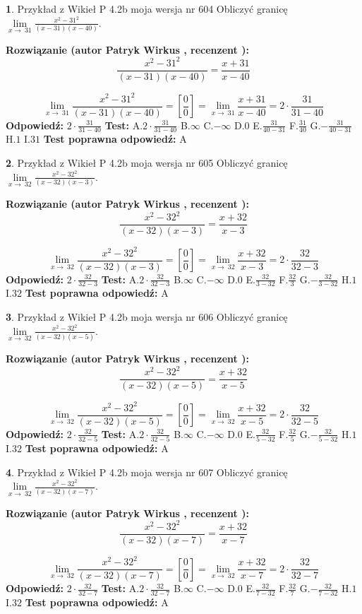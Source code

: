 \documentclass[12pt, a4paper]{article}
\theoremstyle{definition} %
\newtheorem{zad}{}
\newcommand{\zadStart}[1]{\begin{zad}#1\newline}
\newcommand{\zadStop}{\end{zad}}
\newcommand{\rozwStart}[2]{\noindent \textbf{Rozwiązanie (autor #1 , recenzent #2): }\newline}
\newcommand{\rozwStop}{\newline}
\newcommand{\odpStart}{\noindent \textbf{Odpowiedź:}\newline}
\newcommand{\odpStop}{\newline}
\newcommand{\testStart}{\noindent \textbf{Test:}\newline}
\newcommand{\testStop}{\newline}
\newcommand{\kluczStart}{\noindent \textbf{Test poprawna odpowiedź:}\newline}
\newcommand{\kluczStop}{\newline}
\begin{document}
\zadStart{Przykład z Wikieł P 4.2b moja wersja nr 604}
Obliczyć granicę $\lim\limits_{x\to\ 31}\frac{x^{2}-31^{2}}{(x-31)(x-40)}$.
\zadStop
\rozwStart{Patryk Wirkus}{}
$$\frac{x^{2}-31^{2}}{(x-31)(x-40)}=\frac{x+31}{x-40}$$

$$\lim\limits_{x\to\ 31}\frac{x^{2}-31^{2}}{(x-31)(x-40)}=[\frac{0}{0}]=\lim\limits_{x\to\ 31}\frac{x+31}{x-40}=2 \cdot \frac{31}{31-40}$$
\rozwStop
\odpStart
$2 \cdot \frac{31}{31-40}$
\odpStop
\testStart
A.$2 \cdot \frac{31}{31-40}$
B.$\infty$
C.$-\infty$
D.$0$
E.$\frac{31}{40-31}$
F.$\frac{31}{40}$
G.$-\frac{31}{40-31}$
H.$1$
I.$31$
\testStop
\kluczStart
A
\kluczStop



\zadStart{Przykład z Wikieł P 4.2b moja wersja nr 605}
Obliczyć granicę $\lim\limits_{x\to\ 32}\frac{x^{2}-32^{2}}{(x-32)(x-3)}$.
\zadStop
\rozwStart{Patryk Wirkus}{}
$$\frac{x^{2}-32^{2}}{(x-32)(x-3)}=\frac{x+32}{x-3}$$

$$\lim\limits_{x\to\ 32}\frac{x^{2}-32^{2}}{(x-32)(x-3)}=[\frac{0}{0}]=\lim\limits_{x\to\ 32}\frac{x+32}{x-3}=2 \cdot \frac{32}{32-3}$$
\rozwStop
\odpStart
$2 \cdot \frac{32}{32-3}$
\odpStop
\testStart
A.$2 \cdot \frac{32}{32-3}$
B.$\infty$
C.$-\infty$
D.$0$
E.$\frac{32}{3-32}$
F.$\frac{32}{3}$
G.$-\frac{32}{3-32}$
H.$1$
I.$32$
\testStop
\kluczStart
A
\kluczStop



\zadStart{Przykład z Wikieł P 4.2b moja wersja nr 606}
Obliczyć granicę $\lim\limits_{x\to\ 32}\frac{x^{2}-32^{2}}{(x-32)(x-5)}$.
\zadStop
\rozwStart{Patryk Wirkus}{}
$$\frac{x^{2}-32^{2}}{(x-32)(x-5)}=\frac{x+32}{x-5}$$

$$\lim\limits_{x\to\ 32}\frac{x^{2}-32^{2}}{(x-32)(x-5)}=[\frac{0}{0}]=\lim\limits_{x\to\ 32}\frac{x+32}{x-5}=2 \cdot \frac{32}{32-5}$$
\rozwStop
\odpStart
$2 \cdot \frac{32}{32-5}$
\odpStop
\testStart
A.$2 \cdot \frac{32}{32-5}$
B.$\infty$
C.$-\infty$
D.$0$
E.$\frac{32}{5-32}$
F.$\frac{32}{5}$
G.$-\frac{32}{5-32}$
H.$1$
I.$32$
\testStop
\kluczStart
A
\kluczStop



\zadStart{Przykład z Wikieł P 4.2b moja wersja nr 607}
Obliczyć granicę $\lim\limits_{x\to\ 32}\frac{x^{2}-32^{2}}{(x-32)(x-7)}$.
\zadStop
\rozwStart{Patryk Wirkus}{}
$$\frac{x^{2}-32^{2}}{(x-32)(x-7)}=\frac{x+32}{x-7}$$

$$\lim\limits_{x\to\ 32}\frac{x^{2}-32^{2}}{(x-32)(x-7)}=[\frac{0}{0}]=\lim\limits_{x\to\ 32}\frac{x+32}{x-7}=2 \cdot \frac{32}{32-7}$$
\rozwStop
\odpStart
$2 \cdot \frac{32}{32-7}$
\odpStop
\testStart
A.$2 \cdot \frac{32}{32-7}$
B.$\infty$
C.$-\infty$
D.$0$
E.$\frac{32}{7-32}$
F.$\frac{32}{7}$
G.$-\frac{32}{7-32}$
H.$1$
I.$32$
\testStop
\kluczStart
A
\kluczStop
\end{document}
